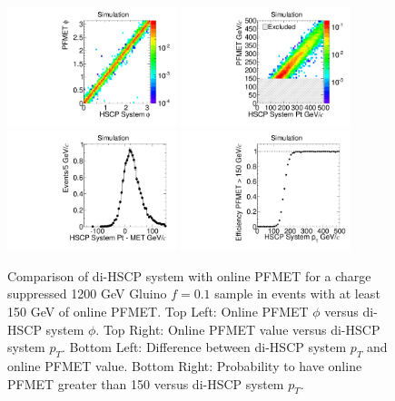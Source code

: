 \begin{figure}
  \begin{center}
      \includegraphics[clip=true, trim=0.0cm 0cm 3.0cm 0cm, width=0.44\textwidth]{figures/search/Gluino_8TeV_M1200N_f10SystPhiMET}
      \includegraphics[clip=true, trim=0.0cm 0cm 3.0cm 0cm, width=0.44\textwidth]{figures/search/Gluino_8TeV_M1200N_f10SystPtMET} \\
      \includegraphics[clip=true, trim=0.0cm 0cm 3.0cm 0cm, width=0.44\textwidth]{figures/search/Gluino_8TeV_M1200N_f10SystPtDiffMET}
      \includegraphics[clip=true, trim=0.0cm 0cm 3.0cm 0cm, width=0.44\textwidth]{figures/search/Gluino_8TeV_M1200N_f10SystPtEff}
      \renewcommand\baselinestretch{1}\caption[Gluino1200f100 System Pt vs MET]
      {Comparison of di-HSCP system with online PFMET for a charge suppressed 1200 GeV Gluino $f=0.1$ sample in events with at least 150 GeV of online PFMET.
         Top Left: Online PFMET $\phi$ versus di-HSCP system $\phi.$ Top Right: Online PFMET value versus di-HSCP system $p_T$.
         Bottom Left: Difference between di-HSCP system $p_T$ and online PFMET value.
         Bottom Right: Probability to have online PFMET greater than 150 versus di-HSCP system $p_T$.
        }
      \renewcommand\baselinestretch{\@spacing}
      \label{fig:SystPtTriggerN}
  \end{center}
\end{figure}


